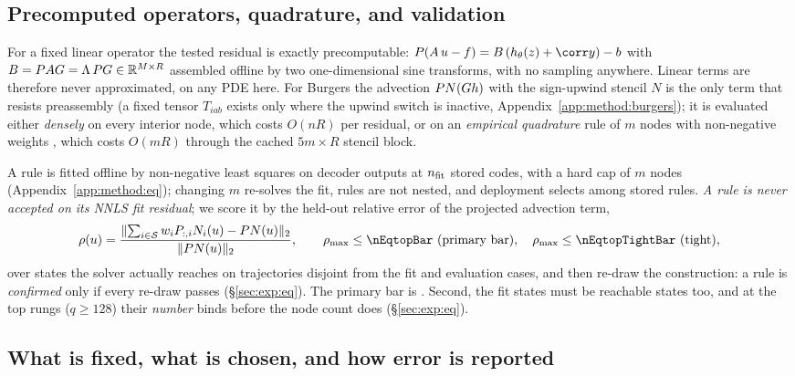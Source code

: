 \subsection{Precomputed operators, quadrature, and validation}
\label{sec:method:precomp}

For a fixed linear operator the tested residual is exactly precomputable:
$\tests(\Aop\,\umanifold-f)=B\,(\head(\latent)+\corr y)-b$ with
$B=PAG=\Lambda\,PG\in\mathbb{R}^{M\times R}$ assembled offline
by two one-dimensional sine transforms, with no sampling anywhere. Linear terms
are therefore never approximated, on any PDE here. For Burgers the advection
$P N(G h)$ with the sign-upwind stencil $N$ is the only term that
resists preassembly (a fixed tensor $T_{iab}$ exists only where the upwind
switch is inactive, Appendix~\ref{app:method:burgers}); it is evaluated either
\emph{densely} on every interior node, which costs $O(nR)$ per residual, or on
an \emph{empirical quadrature} rule of $m$ nodes with non-negative weights
\citep{Hernandez2017EQ,YanoPatera2019LPEQ}, which costs $O(mR)$ through the
cached $5m\times R$ stencil block.

A rule is fitted offline by non-negative least squares
\citep{LawsonHanson1974NNLS} on decoder outputs at $n_{\rm fit}$ stored codes,
with a hard cap of $m$ nodes (Appendix~\ref{app:method:eq}); changing $m$
re-solves the fit, rules are not nested, and deployment selects among stored
rules. \emph{A rule is never accepted on its NNLS fit residual}; we score it by
the held-out relative error of the projected advection term,
\begin{equation}
  \rho(u)=\frac{\norm{\sum_{i\in\mathcal S}w_i\tests_{:,i}N_i(u)-\tests N(u)}_2}{\norm{\tests N(u)}_2},
  \qquad
  \rho_{\max}\le\nEqtopBar\ \text{(primary bar)},\quad \rho_{\max}\le\nEqtopTightBar\ \text{(tight)},
  \label{eq:rho}
\end{equation}
over states the solver actually reaches on trajectories disjoint from the fit
and evaluation cases, and then re-draw the construction: a rule is
\emph{confirmed} only if every re-draw passes (\S\ref{sec:exp:eq}). The
primary bar is \nEqtopBarOrigin. Second, the fit states must be reachable states too, and at the top rungs
($q\ge128$) their \emph{number} binds before the node count does
(\S\ref{sec:exp:eq}).

\subsection{What is fixed, what is chosen, and how error is reported}
\label{sec:method:tuning}

